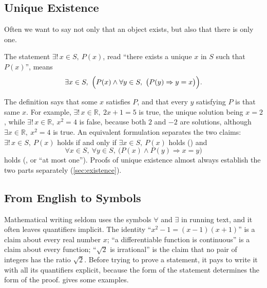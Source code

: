 \subsection{Unique Existence}

Often we want to say not only that an object exists, but also that there is only one.

\begin{definition}
\label{def:unique-existence}
The statement $\exists!\,x\in S,\ P(x)$, read ``there exists a unique $x$ in $S$ such that $P(x)$'', means
\[
\exists x\in S,\ \Bigl(P(x)\wedge\forall y\in S,\ \bigl(P(y)\Rightarrow y=x\bigr)\Bigr).
\]
\end{definition}

The definition says that some $x$ satisfies $P$, and that every $y$ satisfying $P$ is that same $x$. For example, $\exists!\,x\in\mathbb R,\ 2x+1=5$ is true, the unique solution being $x=2$, while $\exists!\,x\in\mathbb R,\ x^2=4$ is false, because both $2$ and $-2$ are solutions, although $\exists x\in\mathbb R,\ x^2=4$ is true. An equivalent formulation separates the two claims: $\exists!\,x\in S,\ P(x)$ holds if and only if $\exists x\in S,\ P(x)$ holds () and
\[
\forall x\in S,\ \forall y\in S,\ \bigl(P(x)\wedge P(y)\Rightarrow x=y\bigr)
\]
holds (, or ``at most one''). Proofs of unique existence almost always establish the two parts separately (\cref{sec:existence}).

\subsection{From English to Symbols}

Mathematical writing seldom uses the symbols $\forall$ and $\exists$ in running text, and it often leaves quantifiers implicit. The identity ``$x^2-1=(x-1)(x+1)$'' is a claim about every real number $x$; ``a differentiable function is continuous'' is a claim about every function; ``$\sqrt2$ is irrational'' is the claim that no pair of integers has the ratio $\sqrt2$. Before trying to prove a statement, it pays to write it with all its quantifiers explicit, because the form of the statement determines the form of the proof.  gives some examples.

